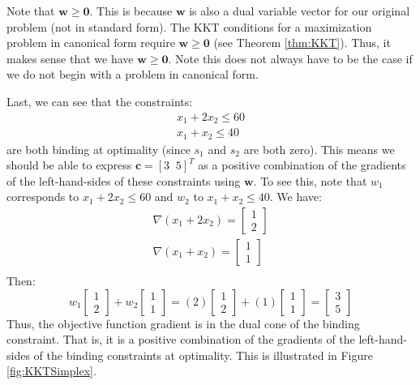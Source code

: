 \begin{example}
Note that $\mathbf{w} \geq \mathbf{0}$. This is because $\mathbf{w}$ is also a dual variable vector for our original problem (not in standard form). The KKT conditions for a maximization problem in canonical form require $\mathbf{w} \geq \mathbf{0}$ (see Theorem \ref{thm:KKT}). Thus, it makes sense that we have $\mathbf{w} \geq \mathbf{0}$. Note this does not always have to be the case if we do not begin with a problem in canonical form. 

Last, we can see that the constraints:
\begin{gather*}
x_1 + 2x_2 \leq 60\\
x_1 + x_2 \leq 40 
\end{gather*}
are both binding at optimality (since $s_1$ and $s_2$ are both zero). This means we should be able to express $\mathbf{c} = [3\;\;5]^T$ as a positive combination of the gradients of the left-hand-sides of these constraints using $\mathbf{w}$. To see this, note that $w_1$ corresponds to $x_1 + 2x_2 \leq 60$ and $w_2$ to $x_1 + x_2 \leq 40$. We have:
\begin{gather*}
\nabla(x_1 + 2x_2) = \begin{bmatrix}1 \\ 2\end{bmatrix}\\
\nabla(x_1 + x_2) = \begin{bmatrix}1 \\ 1\end{bmatrix}\\
\end{gather*}
Then:
\begin{displaymath}
w_1\begin{bmatrix}1 \\ 2\end{bmatrix} + 
w_2\begin{bmatrix}1 \\ 1\end{bmatrix} = 
(2)\begin{bmatrix}1 \\ 2\end{bmatrix} + 
(1)\begin{bmatrix}1 \\ 1\end{bmatrix} = \begin{bmatrix}
3 \\ 5 \end{bmatrix}
\end{displaymath}
Thus, the objective function gradient is in the dual cone of the binding constraint. That is, it is a positive combination of the gradients of the left-hand-sides of the binding constraints at optimality. This is illustrated in Figure \ref{fig:KKTSimplex}.

\end{example}
